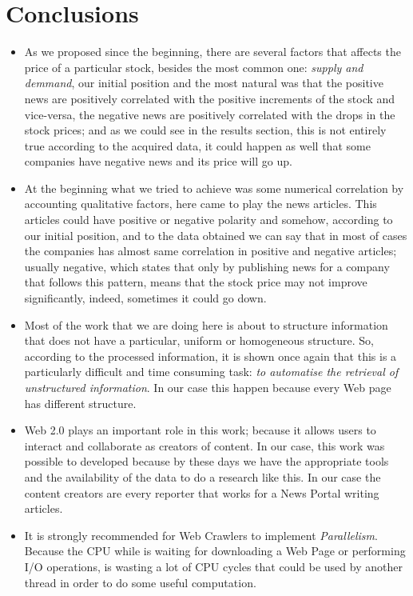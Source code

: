 \section{Conclusions}

	\begin{itemize}
		\item As we proposed since the beginning, there are several factors that affects the price of a particular stock, besides the most common one: \emph{supply and demmand}, our initial position and the most natural was that the positive news are positively correlated with the positive increments of the stock and vice-versa, the negative news are positively correlated with the drops in the stock prices; and as we could see in the results section, this is not entirely true according to the acquired data, it could happen as well that some companies have negative news and its price will go up.
		\item At the beginning what we tried to achieve was some numerical correlation by accounting qualitative factors, here came to play the news articles. This articles could have positive or negative polarity and somehow, according to our initial position, and to the data obtained we can say that in most of cases the companies has almost same correlation in positive and negative articles; usually negative, which states that only by publishing news for a company that follows this pattern, means that the stock price may not improve significantly, indeed, sometimes it could go down.
		\item Most of the work that we are doing here is about to structure information that does not have a particular, uniform or homogeneous structure. So, according to the processed information, it is shown once again that this is a particularly difficult and time consuming task: \emph{to automatise the retrieval of unstructured information}. In our case this happen because every Web page has different structure.
		\item Web 2.0 plays an important role in this work; because it allows users to interact and collaborate as creators of content. In our case, this work was possible to developed because by these days we have the appropriate tools and the availability of the data to do a research like this. In our case the content creators are every reporter that works for a News Portal writing articles.
		\item It is strongly recommended for Web Crawlers to implement \emph{Parallelism}. Because the CPU while is waiting for downloading a Web Page or performing I/O operations, is wasting a lot of CPU cycles that could be used by another thread in order to do some useful computation.
	\end{itemize}

